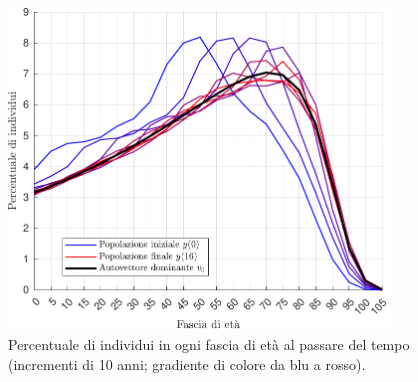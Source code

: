 \begin{figure}[p]
\centering
\includegraphics[width=0.9\textwidth]{leslie-dinamica-normalizzata.pdf}
\caption{Percentuale di individui in ogni fascia di età al passare del tempo\\
(incrementi di 10 anni; gradiente di colore da blu a rosso).}
\label{fig:leslie-dinamica-normalizzata}
\end{figure}

